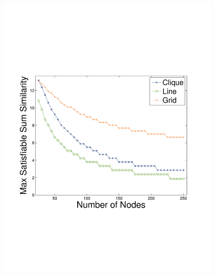 \begin{figure}
{	\includegraphics[scale=0.22, clip=true, trim=14mm 65mm 25mm 65mm]{figures/use_cases_examples/sum_sim_vs_num_nodes_50_T_12_IS_2_W_color.pdf}
        \label{fig:use_case_sum_sim_vs_num_nodes}
        }
  \subfigure[Max Network Size vs. Sum Sim. (Timeliness = 10)]{
}
\end{figure}
